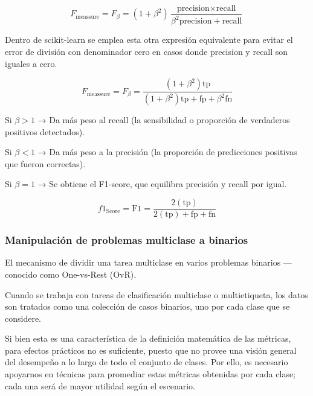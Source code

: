 \begin{equation}
    F_\text{meassure} = F_\beta = (1 + \beta^2) \frac{\text{precision} \times \text{recall}}{\beta^2 \text{precision} + \text{recall}}
\end{equation}

Dentro de scikit-learn se emplea esta otra expresión equivalente para evitar el error de división con denominador cero en casos donde precision y recall son iguales a cero.

\begin{equation}
    F_\text{meassure} = F_\beta = \frac{(1 + \beta^2) \text{tp}}{(1 + \beta^2) \text{tp} + \text{fp} + \beta^2 \text{fn}}
\end{equation}

\cite{fMeassureAndAveragesSkLearn}

Si $\beta > 1$ → Da más peso al recall (la sensibilidad o proporción de verdaderos positivos detectados).

Si $\beta < 1$ → Da más peso a la precisión (la proporción de predicciones positivas que fueron correctas).

Si $\beta = 1$ → Se obtiene el F1-score, que equilibra precisión y recall por igual.

\begin{equation}
    f1_\text{Score} = \text{F1} = \frac{2 (\text{tp})}{2 (\text{tp}) + \text{fp} + \text{fn}}
\end{equation}

\cite{f1scoreSkLearn}


\subsubsection{Manipulación de problemas multiclase a binarios}

El mecanismo de dividir una tarea multiclase en varios problemas binarios —conocido como One-vs-Rest (OvR).

\cite{datacampClassificacion2024}
\cite{sklearnOneVsRest}
\cite{sklearnMultiClass}

Cuando se trabaja con tareas de clasificación multiclase o multietiqueta, los datos son tratados como una colección de casos binarios, uno por cada clase que se considere.

Si bien esta es una característica de la definición matemática de las métricas, para efectos prácticos no es suficiente, puesto que no provee una visión general del desempeño a lo largo de todo el conjunto de clases. Por ello, es necesario apoyarnos en técnicas para promediar estas métricas obtenidas por cada clase; cada una será de mayor utilidad según el escenario.

